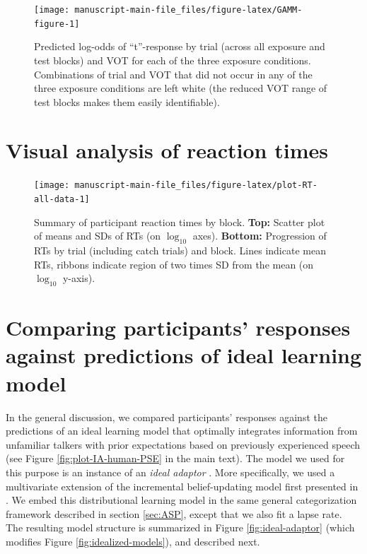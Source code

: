\documentclass[
  11pt,
  man,mask,floatsintext]{apa6}
\begin{document}
\begin{figure}

{\centering \texttt{[image: manuscript-main-file\_files/figure-latex/GAMM-figure-1]} 

}

\caption{Predicted log-odds of ``t''-response by trial (across all exposure and test blocks) and VOT for each of the three exposure conditions. Combinations of trial and VOT that did not occur in any of the three exposure conditions are left white (the reduced VOT range of test blocks makes them easily identifiable).}\label{fig:GAMM-figure}
\end{figure}

\section{Visual analysis of reaction times}\label{visual-analysis-of-reaction-times}



\begin{figure}

{\centering \texttt{[image: manuscript-main-file\_files/figure-latex/plot-RT-all-data-1]} 

}

\caption{Summary of participant reaction times by block. \textbf{Top:} Scatter plot of means and SDs of RTs (on \(\log_{10}\) axes). \textbf{Bottom:} Progression of RTs by trial (including catch trials) and block. Lines indicate mean RTs, ribbons indicate region of two times SD from the mean (on \(\log_{10}\) y-axis).}\label{fig:plot-RT-all-data}
\end{figure}

\section{Comparing participants' responses against predictions of ideal learning model}\label{sec:ideal-adaptor}

In the general discussion, we compared participants' responses against the predictions of an ideal learning model that optimally integrates information from unfamiliar talkers with prior expectations based on previously experienced speech (see Figure \ref{fig:plot-IA-human-PSE} in the main text). The model we used for this purpose is an instance of an \emph{ideal adaptor} \autocite{kleinschmidt-jaeger2015}. More specifically, we used a multivariate extension of the incremental belief-updating model first presented in \textcite{kleinschmidt-jaeger2011}. We embed this distributional learning model in the same general categorization framework described in section \ref{sec:ASP}, except that we also fit a lapse rate. The resulting model structure is summarized in Figure \ref{fig:ideal-adaptor} (which modifies Figure \ref{fig:idealized-models}), and described next.
\end{document}

